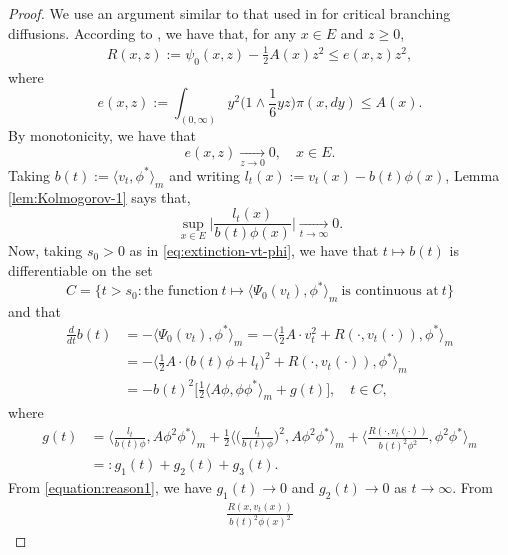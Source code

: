 \documentclass[UTF8]{pkuthss}
\theoremstyle{plain}
\theoremstyle{definition}
\numberwithin{equation}{section}
\begin{document}
\begin{proof}
	We use an argument similar to that used in \cite{Powell2016An-invariance} for critical branching diffusions.
	According to \cite{RenSongZhang2015Limit}, we have that, for any $x\in E$ and $z\geq 0$,
\[\begin{split}
	R(x,z)
	:=\psi_0(x,z)-\frac{1}{2} A(x)z^2
	\leq e(x,z)z^2,
\end{split}\]
	where
\[
	e(x,z)
	:=\int_{(0,\infty)}y^2\big(1\wedge \frac{1}{6}yz\big)\pi(x,dy)
	\leq  A(x).	
\]
	By monotonicity, we have that
\begin{equation}\label{equation:reason2}
	e(x,z)
	\xrightarrow[z\to 0]{} 0,
	\quad x\in E.
\end{equation}
	Taking $b(t):=\langle v_t,\phi^*\rangle_m$ and writing $l_t(x):=v_t(x)-b(t)\phi(x)$, Lemma \ref{lem:Kolmogorov-1} says that,
\begin{equation}\label{equation:reason1}
	\sup_{x\in E}\Big|\frac{l_t(x)}{b(t)\phi(x)}\Big|
	\xrightarrow[t\to\infty]{} 0.
\end{equation}
	Now, taking $s_0>0$ as in \eqref{eq:extinction-vt-phi},
	we have that $t\mapsto b(t)$ is differentiable on the set
\[
	C
	=\{t> s_0: \text{the function}~ t \mapsto \langle\Psi_0(v_t),\phi^*\rangle_m~ \text{is continuous at}~ t \}
\]
	and that
\begin{equation}\label{equation:b(t)}\begin{split}
	\frac{d}{dt}b(t)
	&= -\langle\Psi_0(v_t),\phi^*\rangle_m
	= -\big\langle \frac{1}{2} A \cdot v_t^2+R (\cdot,v_t(\cdot)),\phi^*\big\rangle_m \\
	&= -\big\langle \frac{1}{2}  A \cdot \big(b(t)\phi+l_t\big)^2+R (\cdot,v_t(\cdot)),\phi^*\big\rangle_m\\
	&= -b(t)^2\big[\frac{1}{2} \langle  A\phi,\phi \phi^*\rangle_m+g(t)\big],
	\quad t\in C,
\end{split}\end{equation}	
	where
\[\begin{split}
	g(t)
	&= \Big\langle \frac{l_t}{b(t) \phi}, A\phi^2\phi^*\Big\rangle_m + \frac{1}{2}\Big\langle \Big(\frac{l_t}{b(t) \phi}\Big)^2, A\phi^2\phi^*\Big\rangle_m + \Big\langle \frac{R(\cdot,v_t(\cdot))}{b(t)^2 \phi^2},\phi^2\phi^*\Big\rangle_m \\
	&=: g_1(t) + g_2(t) + g_3(t).
\end{split}\]
	From \eqref{equation:reason1}, we have $g_1(t)\to 0$ and $g_2(t)\to 0$ as $t\to\infty$.
	From
\[\begin{split}
	\frac{R(x,v_t(x))}{b(t)^2 \phi(x)^2}

\end{split}\]
\end{proof}
\end{document}
